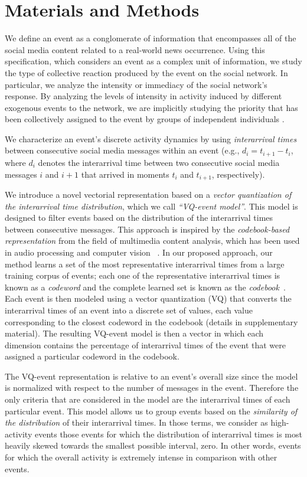 \documentclass[10pt,letterpaper]{article}
\begin{document}
\section*{Materials and Methods}

We define an event as a conglomerate of information that encompasses
all of the social media content related to a real-world news
occurrence. Using this specification, which considers an event as a
complex unit of information, we study the type of collective reaction
produced by the event on the social network. In particular, we analyze 
the intensity or immediacy of the social network's response. 
By analyzing the levels of intensity in activity induced by different exogenous
events to the network, we are implicitly studying the priority that has been
collectively assigned to the event by groups of
independent individuals \cite{barabasi2005origin, karsai2012universal}. 

We characterize an event's discrete activity dynamics by using
\emph{interarrival times} between consecutive social media messages
within an event (e.g., $d_i = t_{i+1}-t_i$, where $d_i$ denotes the
interarrival time between two consecutive social media messages $i$
and $i+1$ that arrived in moments $t_i$ and $t_{i+1}$, respectively).


We introduce a novel vectorial representation based on a {\em vector
quantization of the interarrival time distribution}, which we call 
{\em ``VQ-event model''}. This model is
designed to filter events based on the distribution of the
interarrival times between consecutive messages.  This approach is inspired
by the {\em codebook-based representation} from the field of multimedia
content
analysis, which has been used in audio processing and computer vision
~\cite{ff,Vaizman}.  In our proposed approach, our method learns a set of
the most
representative interarrival times from a large training corpus of events;
each one of the representative interarrival times is known as a
{\em codeword} and the complete learned set is known as the {\em
codebook}~\cite{Vaizman}.  
Each event is then modeled using a vector quantization (VQ) that
converts the interarrival times of an event into a discrete set of values,
each value corresponding to the closest codeword in the codebook (details
in supplementary material).  The resulting VQ-event model is then a
vector in which each dimension contains the percentage of interarrival times
of the event that were assigned a particular codeword in the codebook.


The VQ-event representation is relative to an event's overall size
since the model is normalized with respect to the number of messages in the
event. Therefore the only criteria that are considered in the model are the
interarrival times of each particular event. This model allows us to group events based on the
{\em similarity of the distribution} of their interarrival times.
In those terms, we consider as high-activity events those events for which
the distribution of interarrival times is most heavily
skewed towards the smallest possible interval, zero.  In other words,
events for which the overall activity is extremely intense in comparison
with other events.
\end{document}
